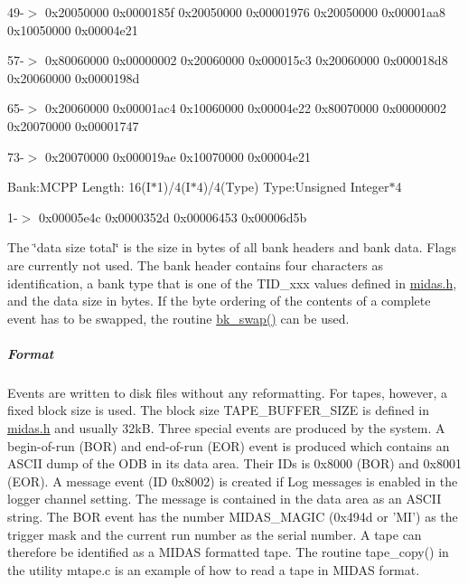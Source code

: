  49-\/$>$ 0x20050000 0x0000185f 0x20050000 0x00001976 0x20050000 0x00001aa8 0x10050000 0x00004e21\par
 57-\/$>$ 0x80060000 0x00000002 0x20060000 0x000015c3 0x20060000 0x000018d8 0x20060000 0x0000198d\par
 65-\/$>$ 0x20060000 0x00001ac4 0x10060000 0x00004e22 0x80070000 0x00000002 0x20070000 0x00001747\par
 73-\/$>$ 0x20070000 0x000019ae 0x10070000 0x00004e21\par
 \par
 Bank:MCPP Length: 16(I$\ast$1)/4(I$\ast$4)/4(Type) Type:Unsigned Integer$\ast$4\par
  1-\/$>$ 0x00005e4c 0x0000352d 0x00006453 0x00006d5b\par
 \par


The \char`\"{}data size total\char`\"{} is the size in bytes of all bank headers and bank data. Flags are currently not used. The bank header contains four characters as identification, a bank type that is one of the TID\_\-xxx values defined in \hyperlink{midas_8h}{midas.h}, and the data size in bytes. If the byte ordering of the contents of a complete event has to be swapped, the routine \hyperlink{group__bkfunctionc_ga44b7381af9b91fbdf2f6d59f55451ea1}{bk\_\-swap()} can be used.

\par


\par
 \label{FE_Data_format_idx_format_Midas_Tape}
\hypertarget{FE_Data_format_idx_format_Midas_Tape}{}
 \hypertarget{FE_Data_format_Tape}{}\subparagraph{Format}\label{FE_Data_format_Tape}
Events are written to disk files without any reformatting. For tapes, however, a fixed block size is used. The block size TAPE\_\-BUFFER\_\-SIZE is defined in \hyperlink{midas_8h}{midas.h} and usually 32kB. Three special events are produced by the system. A begin-\/of-\/run (BOR) and end-\/of-\/run (EOR) event is produced which contains an ASCII dump of the ODB in its data area. Their IDs is 0x8000 (BOR) and 0x8001 (EOR). A message event (ID 0x8002) is created if Log messages is enabled in the logger channel setting. The message is contained in the data area as an ASCII string. The BOR event has the number MIDAS\_\-MAGIC (0x494d or 'MI') as the trigger mask and the current run number as the serial number. A tape can therefore be identified as a MIDAS formatted tape. The routine tape\_\-copy() in the utility mtape.c is an example of how to read a tape in MIDAS format.

